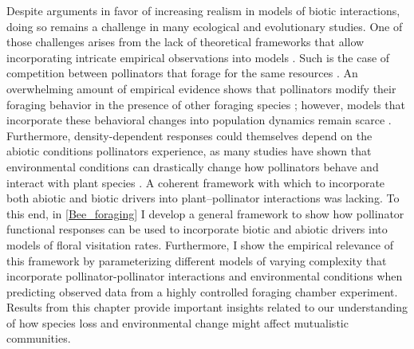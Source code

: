 \begin{refsection}
Despite arguments in favor of increasing realism in models of biotic interactions, doing so remains a challenge in many ecological and evolutionary studies. One of those challenges arises from the lack of theoretical frameworks that allow incorporating intricate empirical observations into models \citep{abrams1983arguments,abrams2001describing}.  Such is the case of competition between pollinators that forage for the same resources \citep{thomson_importance_2020}. An overwhelming amount of empirical evidence shows that pollinators modify their foraging behavior in the presence of other foraging species \citep{morse_resource_1977,inouye_resource_1978,thompson_dynamics_2006,brosi_single_2013,briggs_competitive_2016}; however, models that incorporate these behavioral changes into population dynamics remain scarce \citep{thomson_importance_2020}. Furthermore, density-dependent responses could themselves depend on the abiotic conditions pollinators experience, as many studies have shown that environmental conditions can drastically change how pollinators behave and interact with plant species \citep{heinrich_resource_1976,thomson_response_1987,cnaani_flower_2006,westphal_bumblebees_2006,briggs2018variation,classen2020specialization}. A coherent framework with which to incorporate both abiotic and biotic drivers into plant--pollinator interactions was lacking. To this end, in \autoref{Bee_foraging} I develop a general framework to show how pollinator functional responses can be used to incorporate biotic and abiotic drivers into models of floral visitation rates. Furthermore, I show the empirical relevance of this framework by parameterizing different models of varying complexity that incorporate pollinator-pollinator interactions and environmental conditions when predicting observed data from a highly controlled foraging chamber experiment. Results from this chapter provide important insights related to our understanding of how species loss and environmental change might affect mutualistic communities.



\end{refsection}
